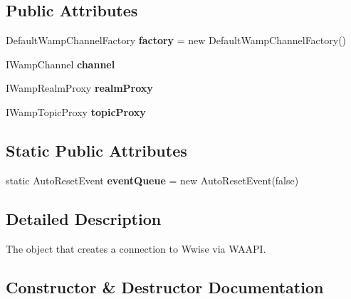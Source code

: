\subsection*{Public Attributes}
\begin{DoxyCompactItemize}
\item 
\mbox{\label{class_waapi_c_s_1_1_communication_1_1_connection_a80d023a259589d9c7e642470c3e289bd}} 
Default\+Wamp\+Channel\+Factory {\bfseries factory} = new Default\+Wamp\+Channel\+Factory()
\item 
\mbox{\label{class_waapi_c_s_1_1_communication_1_1_connection_a9f3345a0bba27ea1888fcf8ae1b4db14}} 
I\+Wamp\+Channel {\bfseries channel}
\item 
\mbox{\label{class_waapi_c_s_1_1_communication_1_1_connection_aaf36be1368da4d7a57e53d173d81c7b4}} 
I\+Wamp\+Realm\+Proxy {\bfseries realm\+Proxy}
\item 
\mbox{\label{class_waapi_c_s_1_1_communication_1_1_connection_a71cb451f001c1fab9b5facc9ce1676fe}} 
I\+Wamp\+Topic\+Proxy {\bfseries topic\+Proxy}
\end{DoxyCompactItemize}
\subsection*{Static Public Attributes}
\begin{DoxyCompactItemize}
\item 
\mbox{\label{class_waapi_c_s_1_1_communication_1_1_connection_a7eb19166d34fcf65f8f9bf99164908c8}} 
static Auto\+Reset\+Event {\bfseries event\+Queue} = new Auto\+Reset\+Event(false)
\end{DoxyCompactItemize}


\subsection{Detailed Description}
The object that creates a connection to Wwise via W\+A\+A\+PI. 



\subsection{Constructor \& Destructor Documentation}
\mbox{\label{class_waapi_c_s_1_1_communication_1_1_connection_a532a29f220d9ff5a79562693a87326b3}} 

